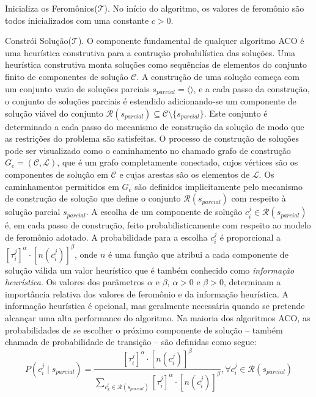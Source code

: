 Inicializa os Feromônios($\mathcal{T}$). No início do algoritmo, os valores de
feromônio são todos inicializados com uma constante $c > 0$. 

Constrói Solução($\mathcal{T}$). O componente fundamental de qualquer algoritmo
ACO é uma heurística construtiva para a contrução probabilística das soluções.
Uma heurística construtiva monta soluções como sequências de elementos do
conjunto finito de componentes de solução $\mathcal{C}$. A construção de uma
solução começa com um conjunto vazio de soluções parciais $s_{parcial} =
\langle \rangle$, e a cada passo da construção, o conjunto de soluções parciais
é estendido adicionando-se um componente de solução viável do conjunto
$\mathcal{R}(s_{parcial}) \subseteq \mathcal{C} \setminus \{s_{parcial}\}$.
Este conjunto é determinado a cada passo do mecanismo de construção da solução
de modo que as restrições do problema são satisfeitas. O processo de construção
de soluções pode ser visualizado como o caminhamento no chamado grafo de
construção $G_{c} = (\mathcal{C}, \mathcal{L})$, que é um grafo completamente
conectado, cujos vértices são os componentes de solução em $\mathcal{C}$ e
cujas arestas são os elementos de $\mathcal{L}$. Os caminhamentos permitidos em
$G_{c}$ são definidos implicitamente pelo mecanismo de construção de solução
que define o conjunto $\mathcal{R}(s_{parcial})$ com respeito à solução parcial
$s_{parcial}$. A escolha de um componente de solução $c_{i}^{j} \in
\mathcal{R}(s_{parcial})$ é, em cada passo de construção, feito
probabilisticamente com respeito ao modelo de feromônio adotado. A
probabilidade para a escolha $c_{i}^{j}$ é proporcional a
$[\tau_{i}^{j}]^{\alpha} \cdot [n(c_{i}^{j})]^{\beta}$, onde $n$ é uma função
que atribui a cada componente de solução válida um valor heurístico que é
também conhecido como \textit{informação heurística}. Os valores dos parâmetros
$\alpha$ e $\beta$, $\alpha > 0$ e $\beta > 0$, determinam a importância
relativa dos valores de feromônio e da informação heurística. A informação
heurística é opcional, mas geralmente necessária quando se pretende alcançar
uma alta performance do algoritmo. Na maioria dos algoritmos ACO, as
probabilidades de se escolher o próximo componente de solução -- também chamada
de probabilidade de transição -- são definidas como segue:
\begin{equation}
\label{eq:acoprob}
P(c_{i}^{j} \mid s_{parcial}) = \frac{[\tau_{i}^{j}]^{\alpha} \cdot
[n(c_{i}^{j})]^{\beta}}{\sum_{c_{k}^{l} \in \mathcal{R}(s_{parcial})}
[\tau_{i}^{j}]^{\alpha} \cdot [n(c_{i}^{j})]^{\beta}}, \forall c_{i}^{j} \in
\mathcal{R}(s_{parcial})
\end{equation}

